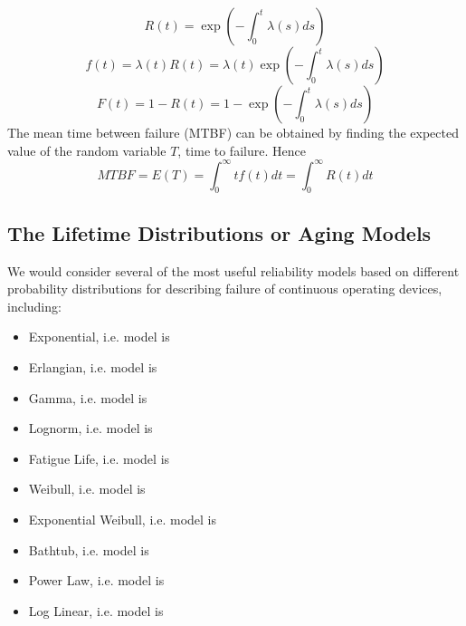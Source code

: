 \begin{equation}
  R(t) = \exp(-\int_{0}^{t} \lambda (s)ds)
\end{equation}
\begin{equation}
	f(t) = \lambda (t)R(t) = \lambda (t)\exp(-\int_{0}^{t} \lambda (s)ds)
\end{equation}
\begin{equation}
 	F(t) = 1 - R(t) = 1 - \exp(-\int_{0}^{t} \lambda (s)ds)
\end{equation}
The mean time between failure (MTBF) can be obtained by finding the expected value of the random variable
$T$, time to failure. Hence
\begin{equation}
  MTBF = E(T) = \int_{0}^{\infty} tf(t)dt = \int_{0}^{\infty} R(t)dt
\end{equation}

\subsection{The Lifetime Distributions or Aging Models}
We would consider several of the most useful reliability models based on different probability
distributions for describing failure of continuous operating devices, including:
\begin{itemize}
	\item Exponential, i.e. model  is 
	\item Erlangian, i.e. model  is 
	\item Gamma, i.e. model  is 
	\item Lognorm, i.e. model  is 
	\item Fatigue Life, i.e. model  is 
	\item Weibull, i.e. model  is 
	\item Exponential Weibull, i.e. model  is 
	\item Bathtub, i.e. model  is 
	\item Power Law, i.e. model  is 
	\item Log Linear, i.e. model  is 
\end{itemize}

